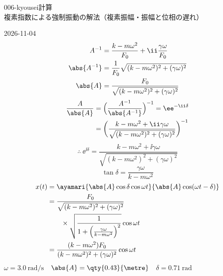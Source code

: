 \documentclass[uplatex,dvipdfmx,a4paper,11pt]{jsarticle}
\begin{document}
\begin{mondai}{006-kyousei}{計算}{複素指数による強制振動の解法（複素振幅・振幅と位相の遅れ）}
\begin{kotaeutsushi}{2026-11-04}
\begin{align*}
A^{-1}&=\frac{k-m\omega^{2}}{F_{0}}+\ii\frac{\gamma\omega}{F_{0}}\\
\abs{A^{-1}}&=\frac{1}{F_{0}}\sqrt{(k-m\omega^{2})^{2}+(\gamma\omega)^{2}}\\
\abs{A}&=\frac{F_{0}}{\sqrt{(k-m\omega^{2})^{2}+(\gamma\omega)^{2}}}
\end{align*}
\begin{align*}
\frac{A}{\abs{A}}&=\Bigl(\frac{A^{-1}}{\abs{A^{-1}}}\Bigr)^{-1}=\ee^{-\ii\delta}\\
&=\biggl(\frac{k-m\omega^{2}+\ii\gamma\omega}{\sqrt{(k-m\omega^{2})^{2}+(\gamma\omega)^{2}}}\biggr)^{-1}
\end{align*}
\[ \therefore\ \ee^{\ii\delta}=\frac{k-m\omega^{2}+\ii\gamma\omega}{\sqrt{(k-m\omega^{2})^{2}+(\gamma\omega)^{2}}} \]
\[ \tan\delta=\frac{\gamma\omega}{k-m\omega^{2}} \]
\begin{align*}
x(t)&=\ayamari{\abs{A}\cos\delta\cos\omega t}{\abs{A}\cos(\omega t-\delta)}\\
&=\frac{F_{0}}{\sqrt{(k-m\omega^{2})^{2}+(\gamma\omega)^{2}}}\\
&\qquad\times\sqrt{\frac{1}{1+\left(\frac{\gamma\omega}{k-m\omega^{2}}\right)^{2}}}\cos\omega t\\
&=\frac{(k-m\omega^{2})F_{0}}{(k-m\omega^{2})^{2}+(\gamma\omega)^{2}}\cos\omega t
\end{align*}
$\omega=\qty{3.0}{\radian\per\second}$　$\abs{A}=\qty{0.43}{\metre}$　$\delta=\qty{0.71}{\radian}$


\end{kotaeutsushi}
\end{mondai}
\end{document}
